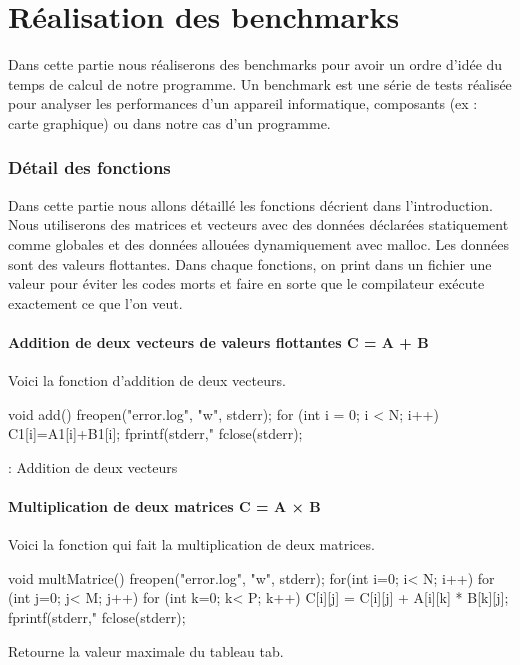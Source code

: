 \documentclass{rapport}
\begin{document}
  \clearpage
  \part{Réalisation des benchmarks}
  
    Dans cette partie nous réaliserons des benchmarks pour avoir un ordre d'idée du temps de calcul de notre programme.
    Un benchmark est une série de tests réalisée pour analyser les performances d'un appareil informatique, composants (ex : carte graphique) ou dans notre cas d'un programme.
    
    \section{Détail des fonctions}
      Dans cette partie nous allons détaillé les fonctions décrient dans l'introduction. Nous utiliserons des matrices et vecteurs avec des données déclarées statiquement comme globales et des données allouées dynamiquement avec malloc. Les données sont des valeurs flottantes. Dans chaque fonctions, on print dans un fichier une valeur pour éviter les codes morts et faire en sorte que le compilateur exécute exactement ce que l'on veut.
      \subsection{Addition de deux vecteurs de valeurs flottantes C = A + B}
        Voici la fonction d'addition de deux vecteurs.
        \begin{algorithm}
        \begin{C}
void add() {
	freopen("error.log", "w", stderr);
    for (int i = 0; i < N; i++) {
        C1[i]=A1[i]+B1[i];
        fprintf(stderr,"%
    }
    fclose(stderr);
}
        \end{C}
        \caption[Algo en C]{: Addition de deux vecteurs\label{ag:algoc}}
        \end{algorithm}
        
      \subsection{Multiplication de deux matrices C = A × B}
        Voici la fonction qui fait la multiplication de deux matrices.
        \begin{algorithm}
        \begin{C}
void multMatrice(){
    freopen("error.log", "w", stderr);
    for(int i=0; i< N; i++){
        for (int j=0; j< M; j++){
            for (int k=0; k< P; k++){
                C[i][j] = C[i][j] + A[i][k] * B[k][j];
            }
            fprintf(stderr,"%
        }
    }
    fclose(stderr);
}
        \end{C}
        \caption[Algo en C]{Retourne la valeur maximale du tableau tab.\label{ag:algoc}}
        \end{algorithm}
\end{document}
